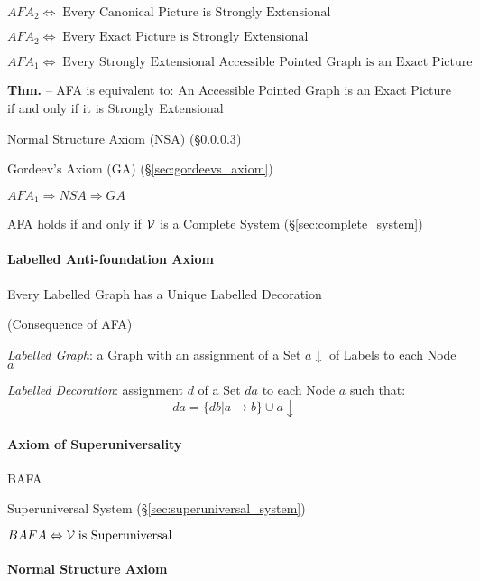 $AFA_2 \Leftrightarrow \;\text{Every Canonical Picture is Strongly
  Extensional}$

$AFA_2 \Leftrightarrow \;\text{Every Exact Picture is Strongly
  Extensional}$

$AFA_1 \Leftrightarrow \;\text{Every Strongly Extensional Accessible
  Pointed Graph is an Exact Picture}$

\textbf{Thm.} -- AFA is equivalent to: An Accessible Pointed Graph is
an Exact Picture if and only if it is Strongly Extensional

Normal Structure Axiom (NSA) (\S\ref{sec:normal_structure_axiom})

Gordeev's Axiom (GA) (\S\ref{sec:gordeevs_axiom})

$AFA_1 \Rightarrow NSA \Rightarrow GA$

AFA holds if and only if $\mathcal{V}$ is a Complete System
(\S\ref{sec:complete_system})



\paragraph{Labelled Anti-foundation Axiom}
\label{sec:labelled_antifoundation}\hfill

\cite{aczel88}

Every Labelled Graph has a Unique Labelled Decoration

(Consequence of AFA)

\emph{Labelled Graph}: a Graph with an assignment of a Set
$a\downarrow$ of Labels to each Node $a$

\emph{Labelled Decoration}: assignment $d$ of a Set $d a$ to each Node
$a$ such that:
\[
  da = \{db | a \rightarrow b\} \cup a \downarrow
\]



\paragraph{Axiom of Superuniversality}
\label{sec:superuniversality_axiom}\hfill

BAFA

Superuniversal System (\S\ref{sec:superuniversal_system})

$BAFA \Leftrightarrow \mathcal{V} \;\text{is Superuniversal}$



\paragraph{Normal Structure Axiom}
\label{sec:normal_structure_axiom}\hfill

